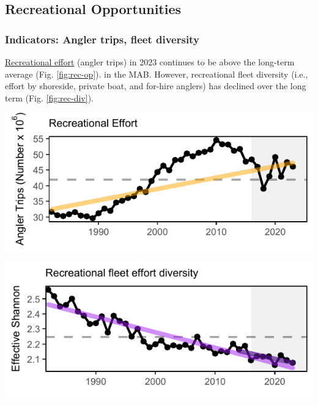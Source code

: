 \documentclass[
  10pt,
]{article}
\let\origfigure\figure
\let\endorigfigure\endfigure
\renewenvironment{figure}[1][2] {
    \expandafter\origfigure\expandafter[H]
} {
    \endorigfigure
}
\begin{document}
\subsection{Recreational Opportunities}\label{recreational-opportunities}

\subsubsection{Indicators: Angler trips, fleet diversity}\label{indicators-angler-trips-fleet-diversity}

\href{https://noaa-edab.github.io/catalog/recdat.html}{Recreational effort} (angler trips) in 2023 continues to be above the long-term average (Fig. \ref{fig:rec-op}). in the MAB. However, recreational fleet diversity (i.e., effort by shoreside, private boat, and for-hire anglers) has declined over the long term (Fig. \ref{fig:rec-div}).

\begin{figure}

{\centering \includegraphics{midatlantic_files/figure-latex/rec-op-1} 

}

\caption{Recreational effort (number of trips, black) in the Mid-Atlantic, with significant increase (orange line).}\label{fig:rec-op}
\end{figure}

\begin{figure}

{\centering \includegraphics{midatlantic_files/figure-latex/rec-div-1} 

}

\caption{Recreational fleet effort diversity (black) in the Mid-Atlantic, with significant decrease (purple line).}\label{fig:rec-div}
\end{figure}
\end{document}
